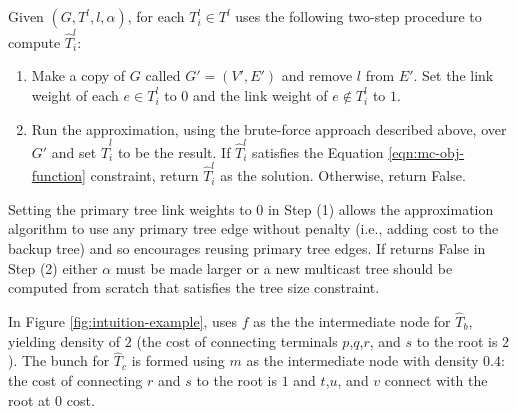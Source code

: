 Given $(G,T^l,l,\alpha)$, for each $T_i^l \in T^l$ \steiner uses the following two-step procedure to compute $\hat{T}^l_i$:
\begin{enumerate}
	
	\item Make a copy of $G$ called $G'=(V',E')$ and remove $l$ from $E'$.  Set the link weight of each $e \in T^l_i$ to $0$ and the link weight of $e \notin T^l_i$ to $1$. 

	\item Run the \arbor approximation, using the brute-force approach described above, over $G'$ and set $\hat{T}^l_i$ to be the result.
	If $\hat{T}^l_i$ satisfies the Equation \ref{eqn:mc-obj-function} constraint, return $\hat{T}^l_i$ as the solution.  Otherwise, return False. 

\end{enumerate}
Setting the primary tree link weights to $0$ in Step (1) allows the \arbor approximation algorithm to use any primary tree edge without penalty (i.e., adding cost to the 
backup tree) and so encourages reusing primary tree edges.  If \steiner returns False in Step (2) either $\alpha$ must be made larger or a new multicast tree should be computed from
scratch that satisfies the tree size constraint.

In Figure \ref{fig:intuition-example}, \steiner uses $f$ as the the intermediate node for $\hat{T}_b$, yielding density of $2$ (the cost of connecting terminals $p$,$q$,$r$, and $s$ to the 
root is $2$).   The bunch for $\hat{T}_c$ is formed using $m$ as the intermediate node with density $0.4$: the cost of connecting $r$ and $s$ to the root is $1$ and $t$,$u$, and $v$ connect
with the root at $0$ cost. 


